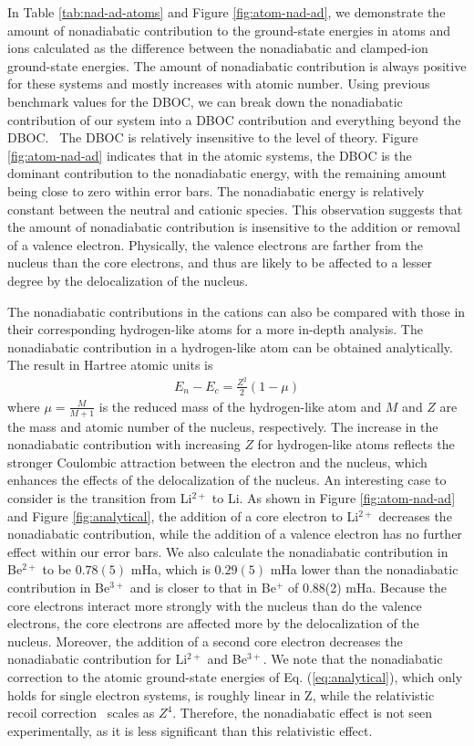 In Table \ref{tab:nad-ad-atoms} and Figure \ref{fig:atom-nad-ad}, we demonstrate the amount of nonadiabatic contribution to the ground-state energies in atoms and ions calculated as the difference between the nonadiabatic and clamped-ion ground-state energies. The amount of nonadiabatic contribution is always positive for these systems and mostly increases with atomic number. Using previous benchmark values for the DBOC, we can break down the nonadiabatic contribution of our system into a DBOC contribution and everything beyond the DBOC.~\cite{Klopper_DBOC,CFOUR,Harding} The DBOC is relatively insensitive to the level of theory. Figure \ref{fig:atom-nad-ad} indicates that in the atomic systems, the DBOC is the dominant contribution to the nonadiabatic energy, with the remaining amount being close to zero within error bars. The nonadiabatic energy is relatively constant between the neutral and cationic species. This observation suggests that the amount of nonadiabatic contribution is insensitive to the addition or removal of a valence electron. Physically, the valence electrons are farther from the nucleus than the core electrons, and thus are likely to be affected to a lesser degree by the delocalization of the nucleus. 

The nonadiabatic contributions in the cations can also be compared with those in their corresponding hydrogen-like atoms for a more in-depth analysis. The nonadiabatic contribution in a hydrogen-like atom can be obtained analytically. The result in Hartree atomic units is
\begin{align}
E_n-E_c=\frac{Z^2}{2}(1-\mu) \label{eq:analytical}
\end{align}
where $\mu=\frac{M}{M+1}$ is the reduced mass of the hydrogen-like atom and $M$ and $Z$ are the mass and atomic number of the nucleus, respectively. The increase in the nonadiabatic contribution with increasing $Z$ for hydrogen-like atoms reflects the stronger Coulombic attraction between the electron and the nucleus, which enhances the effects of the delocalization of the nucleus. An interesting case to consider is the transition from Li$^{2+}$ to Li. As shown in Figure \ref{fig:atom-nad-ad} and Figure \ref{fig:analytical}, the addition of a core electron to Li$^{2+}$ decreases the nonadiabatic contribution, while the addition of a valence electron has no further effect within our error bars. We also calculate the nonadiabatic contribution in Be$^{2+}$ to be $0.78(5)$ mHa, which is $0.29(5)$ mHa lower than the nonadiabatic contribution in Be$^{3+}$ and is closer to that in Be$^{+}$ of 0.88(2) mHa. Because the core electrons interact more strongly with the nucleus than do the valence electrons, the core electrons are affected more by the delocalization of the nucleus. Moreover, the addition of a second core electron decreases the nonadiabatic contribution for Li$^{2+}$ and Be$^{3+}$. %
We note that the nonadiabatic correction to the atomic ground-state energies of Eq. (\ref{eq:analytical}), which only holds for single electron systems, is roughly linear in Z, while the relativistic recoil correction~\cite{Merkt_H2} scales as $Z^4$. Therefore, the nonadiabatic effect is not seen experimentally,  as it is less significant than this relativistic effect.

